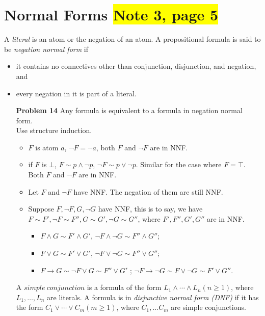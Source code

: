 \documentclass[12pt]{article}
\begin{document}
\newpage
\section*{Normal Forms \colorbox{yellow}{Note 3, page 5}}
A \textit{literal} is an atom or the negation of an atom. A propositional formula is said to be \textit{negation normal form} if 
\begin{itemize}
    \item it contains no connectives other than conjunction, disjunction, and negation, and 
    \item every negation in it is part of a literal. 
\end{itemize}

\begin{enumerate}
\item[\textbf{Problem 14}] Any formula is equivalent to a formula in negation normal form.  \\
Use structure induction. 
\begin{itemize}
\item $F$ is atom $a$, $\neg F = \neg a$, both $F$ and $\neg F$ are in NNF.  
\item if $F$ is $\bot$, $ F \sim p \wedge \neg p$, $\neg F \sim p \vee \neg p$. Similar for the case where $F = \top$. Both $F$ and $\neg F$ are in NNF. 
\item Let $F$ and $\neg F$ have NNF. The negation of them are still NNF. 
\item Suppose $F, \neg F, G, \neg G$ have NNF, this is to say, we have $F \sim F', \neg F \sim F'', G \sim G', \neg G \sim G''$, where $F', F'', G', G''$ are in NNF. 
    \begin{itemize}
        \item $F \wedge G \sim F' \wedge G'$,  \quad $\neg F \wedge \neg G \sim F'' \wedge G''$;
        \item $F \vee G \sim F' \vee G'$,  \quad $\neg F \vee \neg G \sim F'' \vee G''$;
        \item $F \rightarrow G \sim \neg F \vee G \sim F'' \vee G'$ ; \quad $\neg F \rightarrow \neg G \sim F \vee \neg G \sim F' \vee G''$. 
        
    \end{itemize}
\end{itemize}

A $simple~ conjunction$ is a formula of the form $L_1 \wedge \cdots \wedge L_n (n \geq 1)$, where $L_1, \ldots, L_n$ are literals. A formula is in \textit{disjunctive normal form (DNF)} if it has the form $C_1 \vee \cdots \vee C_m (m \geq 1)$, where $C_1, \ldots C_m$ are simple conjunctions. 



\end{enumerate}
\end{document}
